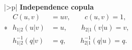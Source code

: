 \documentclass[12pt,oneside,a4paper]{book}
\theoremstyle{definition}
\theoremstyle{remark}
\begin{document}
{\begin{longtable}{|>{\centering\arraybackslash}p{\dimexpr{}\arrayrulewidth\relax}|}
		\textbf{Independence copula} \\*
		\smallskip
		\(\displaystyle\begin{aligned}
			C(u,v) &= uv, \qquad c(u,v) = 1, \\
			h_{1|2}(u|v) &= u, \qquad h_{2|1}(v|u)=v, \\
			h^{-1}_{1|2}(q|v) &= q, \qquad h^{-1}_{2|1}(q|u)=q.
		\end{aligned}\)
		\smallskip \\
	\end{longtable}}
	
	
\end{document}
